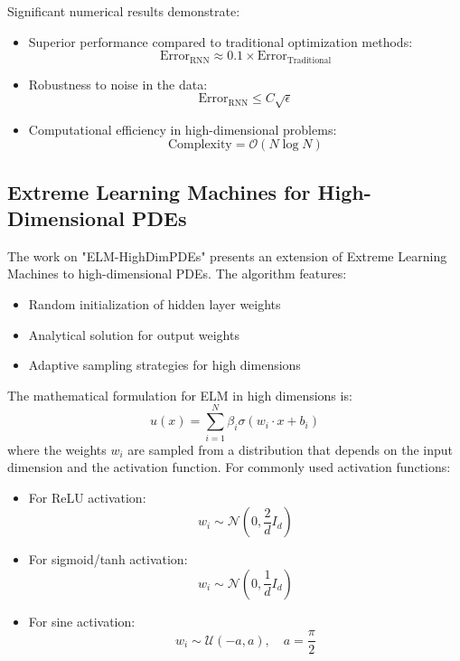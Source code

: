 \documentclass[12pt]{article}
\begin{document}
Significant numerical results demonstrate:
\begin{itemize}
    \item Superior performance compared to traditional optimization methods:
    \begin{equation}
        \text{Error}_{\text{RNN}} \approx 0.1 \times \text{Error}_{\text{Traditional}}
    \end{equation}
    \item Robustness to noise in the data:
    \begin{equation}
        \text{Error}_{\text{RNN}} \leq C \sqrt{\epsilon}
    \end{equation}
    \item Computational efficiency in high-dimensional problems:
    \begin{equation}
        \text{Complexity} = \mathcal{O}(N \log N)
    \end{equation}
\end{itemize}

\subsection{Extreme Learning Machines for High-Dimensional PDEs}
\label{subsec:elm_highdim}
The work on "ELM-HighDimPDEs" presents an extension of Extreme Learning Machines to high-dimensional PDEs. The algorithm features:

\begin{itemize}
    \item Random initialization of hidden layer weights
    \item Analytical solution for output weights
    \item Adaptive sampling strategies for high dimensions
\end{itemize}

The mathematical formulation for ELM in high dimensions is:
\begin{equation}
    u(x) = \sum_{i=1}^{N} \beta_i \sigma(w_i \cdot x + b_i)
\end{equation}
where the weights $w_i$ are sampled from a distribution that depends on the input dimension and the activation function. For commonly used activation functions:

\begin{itemize}
    \item For ReLU activation:
    \begin{equation}
        w_i \sim \mathcal{N}(0, \frac{2}{d}I_d)
    \end{equation}
    \item For sigmoid/tanh activation:
    \begin{equation}
        w_i \sim \mathcal{N}(0, \frac{1}{d}I_d)
    \end{equation}
    \item For sine activation:
    \begin{equation}
        w_i \sim \mathcal{U}(-a, a), \quad a = \frac{\pi}{2}
    \end{equation}
\end{itemize}
\end{document}
